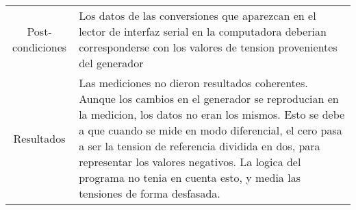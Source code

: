 \begin{table}[h]
\begin{tabular}{
>{\columncolor[HTML]{D3FBFA}}c 
>{\columncolor[HTML]{D3FBFA}}l }
Post-condiciones & Los datos de las conversiones que aparezcan en el lector de interfaz serial en la computadora deberian corresponderse con los valores de tension provenientes del generador  
\\ 
Resultados       & Las mediciones no dieron resultados coherentes. Aunque los cambios en el generador se reproducian en la medicion, los datos no eran los mismos. Esto se debe a que cuando se mide en modo diferencial, el cero pasa a ser la tension de referencia dividida en dos, para representar los valores negativos. La logica del programa no tenia en cuenta esto, y media las tensiones de forma desfasada.                                                                                                                                                     
\end{tabular}
\end{table}

